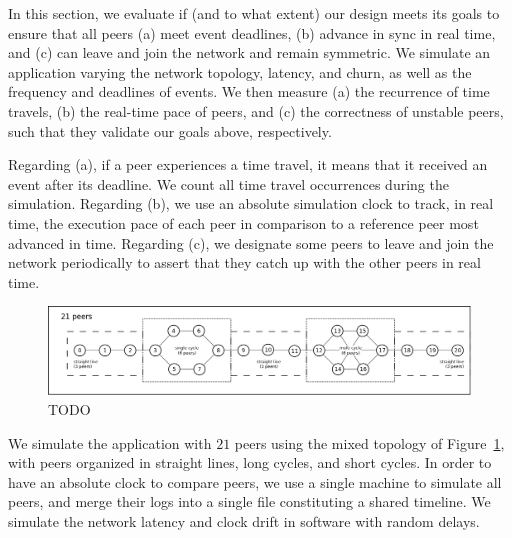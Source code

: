 \documentclass[10pt,journal,compsoc]{IEEEtran}
\begin{document}
In this section, we evaluate if (and to what extent) our design meets its goals
to ensure that all peers (a) meet event deadlines, (b) advance in sync in real
time, and (c) can leave and join the network and remain symmetric.
%
We simulate an application varying the network topology, latency, and churn, as
well as the frequency and deadlines of events.
%
We then measure (a) the recurrence of time travels, (b) the real-time pace of
peers, and (c) the correctness of unstable peers, such that they validate our
goals above, respectively.

Regarding (a), if a peer experiences a time travel, it means that it received
an event after its deadline.
We count all time travel occurrences during the simulation.
%
Regarding (b), we use an absolute simulation clock to track, in real time, the
execution pace of each peer in comparison to a reference peer most advanced in
time.
%
Regarding (c), we designate some peers to leave and join the network
periodically to assert that they catch up with the other peers in real time.

\begin{figure}[t]
  \centering
  \includegraphics[width=\linewidth]{topo}
  \caption{
    \label{fig.topo}
    TODO
  }
\end{figure}

We simulate the application with $21$ peers using the mixed topology of
Figure~\ref{fig.topo}, with peers organized in straight lines, long cycles, and
short cycles.
%
In order to have an absolute clock to compare peers, we use a single machine
to simulate all peers, and merge their logs into a single file constituting a
shared timeline.
%
We simulate the network latency and clock drift in software with random delays.
\end{document}
